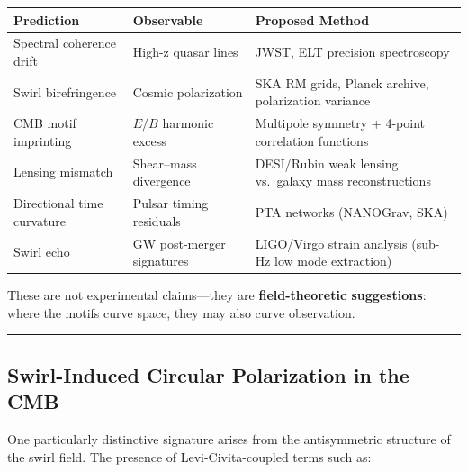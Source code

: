 \documentclass[
  11pt,
]{article}
\begin{document}
\begin{longtable}[]{@{}
  >{\raggedright\arraybackslash}p{}
  >{\raggedright\arraybackslash}p{}
  >{\raggedright\arraybackslash}p{}@{}}
\toprule\noalign{}
\begin{minipage}[b]{\linewidth}\raggedright
Prediction
\end{minipage} & \begin{minipage}[b]{\linewidth}\raggedright
Observable
\end{minipage} & \begin{minipage}[b]{\linewidth}\raggedright
Proposed Method
\end{minipage} \\
\midrule\noalign{}
\endhead
\bottomrule\noalign{}
\endlastfoot
Spectral coherence drift & High-z quasar lines & JWST, ELT precision
spectroscopy \\
Swirl birefringence & Cosmic polarization & SKA RM grids, Planck
archive, polarization variance \\
CMB motif imprinting & \(E/B\) harmonic excess & Multipole symmetry +
4-point correlation functions \\
Lensing mismatch & Shear--mass divergence & DESI/Rubin weak lensing
vs.~galaxy mass reconstructions \\
Directional time curvature & Pulsar timing residuals & PTA networks
(NANOGrav, SKA) \\
Swirl echo & GW post-merger signatures & LIGO/Virgo strain analysis
(sub-Hz low mode extraction) \\
\end{longtable}

These are not experimental claims---they are \textbf{field-theoretic
suggestions}: where the motifs curve space, they may also curve
observation.

\begin{center}\rule{0.5\linewidth}{0.5pt}\end{center}

\subsection{Swirl-Induced Circular Polarization in the
CMB}\label{swirl-induced-circular-polarization-in-the-cmb}

One particularly distinctive signature arises from the antisymmetric
structure of the swirl field. The presence of Levi-Civita-coupled terms
such as:
\end{document}
